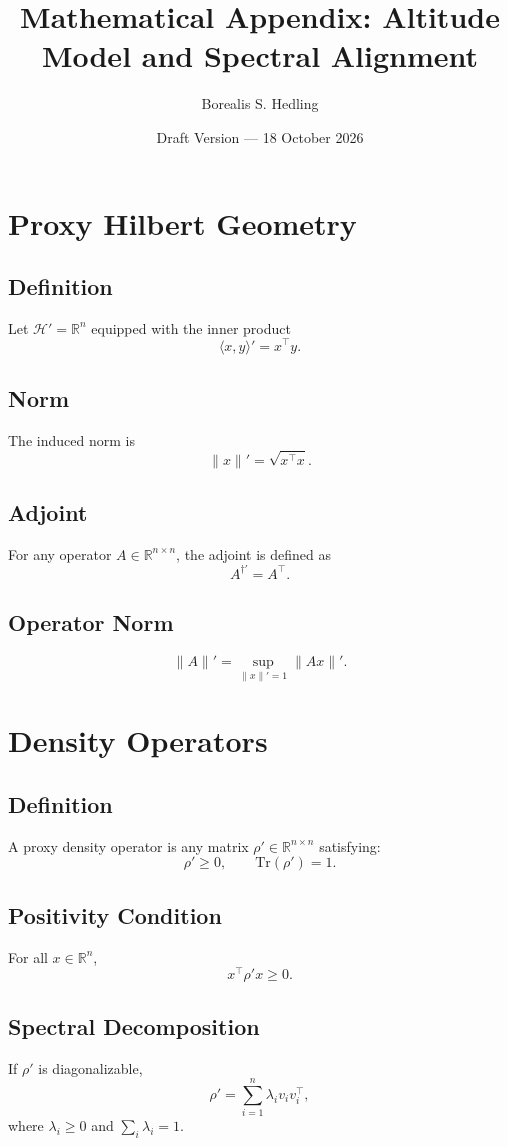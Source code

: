 \documentclass[11pt]{article}
\title{Mathematical Appendix: Altitude Model and Spectral Alignment}
\author{Borealis S. Hedling}
\date{Draft Version — 18 October 2026}
\begin{document}
\maketitle

\tableofcontents

\section{Proxy Hilbert Geometry}

\subsection{Definition}
Let $\mathcal{H}' = \mathbb{R}^n$ equipped with the inner product
\[
\langle x, y \rangle' = x^\top y.
\]

\subsection{Norm}
The induced norm is
\[
\|x\|' = \sqrt{x^\top x}.
\]

\subsection{Adjoint}
For any operator $A \in \mathbb{R}^{n \times n}$, the adjoint is defined as
\[
A^{\dagger'} = A^\top.
\]

\subsection{Operator Norm}
\[
\|A\|' = \sup_{\|x\|' = 1} \|Ax\|'.
\]

\section{Density Operators}

\subsection{Definition}
A proxy density operator is any matrix $\rho' \in \mathbb{R}^{n \times n}$ satisfying:
\[
\rho' \ge 0, \qquad \mathrm{Tr}(\rho') = 1.
\]

\subsection{Positivity Condition}
For all $x \in \mathbb{R}^n$,
\[
x^\top \rho' x \ge 0.
\]

\subsection{Spectral Decomposition}
If $\rho'$ is diagonalizable,
\[
\rho' = \sum_{i=1}^n \lambda_i v_i v_i^\top,
\]
where $\lambda_i \ge 0$ and $\sum_i \lambda_i = 1$.
\end{document}
